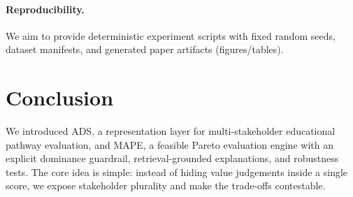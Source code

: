 \documentclass[sigconf,review]{acmart}
\newif\ifdraft
\newcommand{\draftonly}[1]{\ifdraft #1\fi}
\newcommand{\todo}[1]{\textcolor{red}{\textbf{[TODO: #1]}}}
\newcommand{\ADS}{\textsc{ADS}\xspace}
\newcommand{\MAPE}{\textsc{MAPE}\xspace}
\begin{document}
\paragraph{Reproducibility.}
We aim to provide deterministic experiment scripts with fixed random seeds, dataset manifests, and generated paper artifacts (figures/tables). \draftonly{\todo{Add concrete commands + seeds once repo is frozen.}}



\section{Conclusion}
We introduced \ADS, a representation layer for multi-stakeholder educational pathway evaluation, and \MAPE, a feasible Pareto evaluation engine with an explicit dominance guardrail, retrieval-grounded explanations, and robustness tests. The core idea is simple: instead of hiding value judgements inside a single score, we expose stakeholder plurality and make the trade-offs contestable.





\appendix

\end{document}
